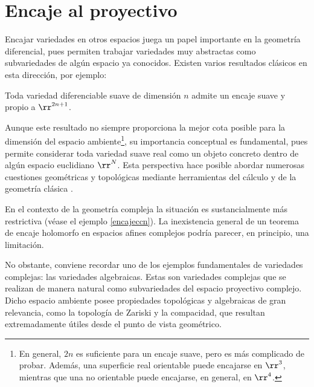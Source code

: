 \chapter{Encaje al proyectivo}\label{cap2}

	Encajar variedades en otros espacios juega un papel importante en la geometría diferencial, pues permiten trabajar variedades muy abstractas como subvariedades de algún espacio ya conocidos. Existen varios resultados clásicos en esta dirección, por ejemplo:
	
    \begin{theorem}
        Toda variedad diferenciable suave de dimensión $n$ admite un encaje suave y propio a $\rr^{2n+1}$.
    \end{theorem}
    
    Aunque este resultado no siempre proporciona la mejor cota posible para la dimensión del espacio ambiente\footnote{En general, $2n$ es suficiente para un encaje suave, pero es más complicado de probar. Además, una superficie real orientable puede encajarse en $\rr^3$, mientras que una no orientable puede encajarse, en general, en $\rr^4$.}, su importancia conceptual es fundamental, pues permite considerar toda variedad suave real como un objeto concreto dentro de algún espacio euclidiano $\rr^N$. Esta perspectiva hace posible abordar numerosas cuestiones geométricas y topológicas mediante herramientas del cálculo y de la geometría clásica \parencite[Ver Cap.~6]{lee2003smooth}.
    
    En el contexto de la geometría compleja la situación es sustancialmente más restrictiva (véase el ejemplo \ref{encajeccn}). La inexistencia general de un teorema de encaje holomorfo en espacios afines complejos podría parecer, en principio, una limitación.
    
    No obstante, conviene recordar uno de los ejemplos fundamentales de variedades complejas: las variedades algebraicas. Estas son variedades complejas que se realizan de manera natural como subvariedades del espacio proyectivo complejo. Dicho espacio ambiente posee propiedades topológicas y algebraicas de gran relevancia, como la topología de Zariski y la compacidad, que resultan extremadamente útiles desde el punto de vista geométrico.
   
